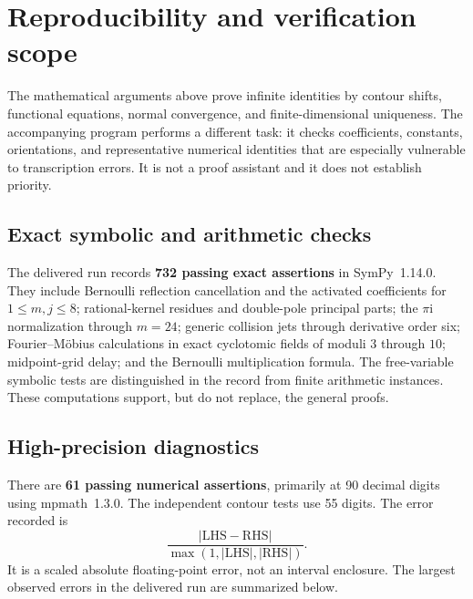 \documentclass[11pt,a4paper]{article}
\numberwithin{equation}{section}
\theoremstyle{definition}\newtheorem{definition}[theorem]{Definition}
\theoremstyle{remark}\newtheorem{remark}[theorem]{Remark}
\newcommand{\ii}{\mathrm i}\newcommand{\e}{\mathrm e}
\begin{document}
\section{Reproducibility and verification scope}
\label{sec:verification}

The mathematical arguments above prove infinite identities by contour
shifts, functional equations, normal convergence, and finite-dimensional
uniqueness. The accompanying program performs a different task: it
checks coefficients, constants, orientations, and representative
numerical identities that are especially vulnerable to transcription
errors. It is not a proof assistant and it does not establish priority.

\subsection{Exact symbolic and arithmetic checks}
The delivered run records \textbf{732 passing exact assertions} in
SymPy~1.14.0. They include Bernoulli reflection cancellation and the
activated coefficients for $1\le m,j\le8$; rational-kernel residues and
double-pole principal parts; the $\pi\ii$ normalization through
$m=24$; generic collision jets through derivative order six;
Fourier--M\"obius calculations in exact cyclotomic fields of moduli
$3$ through $10$; midpoint-grid delay; and the Bernoulli multiplication
formula. The free-variable symbolic tests are distinguished in the
record from finite arithmetic instances. These computations support,
but do not replace, the general proofs.

\subsection{High-precision diagnostics}
There are \textbf{61 passing numerical assertions}, primarily at
90 decimal digits using mpmath~1.3.0. The independent contour tests use
55 digits. The error recorded is
\begin{equation}
 \frac{|\mathrm{LHS}-\mathrm{RHS}|}
           {\max(1,|\mathrm{LHS}|,|\mathrm{RHS}|)}.
 \label{eq:error-metric}
\end{equation}
It is a scaled absolute floating-point error, not an interval enclosure.
The largest observed errors in the delivered run are summarized below.
\end{document}
